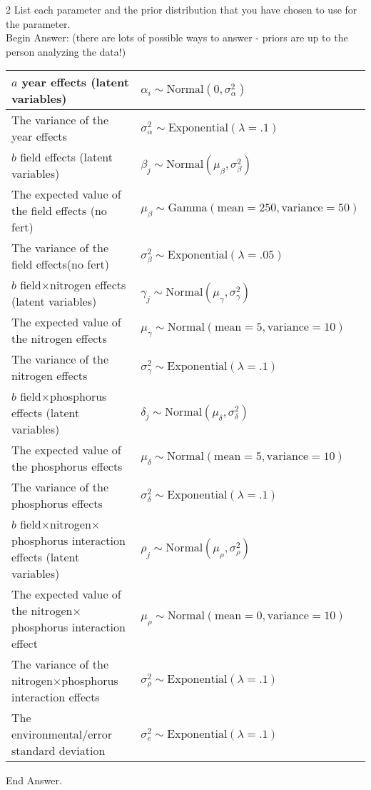 \documentclass[11pt]{article}
\newcommand{\answer}[1]{{\color{red}\sc Begin Answer: }#1{\color{red}\sc End Answer.\\}}
\begin{document}
\begin{doublespace}	
\begin{compactenum}
	\item[2] List each parameter and the prior distribution that you have chosen to use for the parameter.
	\\\answer{ (there are lots of possible ways to answer - priors are up to the person analyzing the data!)
\begin{center}
\begin{tabular}{|p{9cm}l|}
\hline
$a$ year effects (latent variables)&  $\alpha_i\sim \mbox{Normal}(0, \sigma_{\alpha}^2)$\\
\hline
The variance of the year effects &  $\sigma_{\alpha}^2 \sim \mbox{Exponential}(\lambda=.1)$ \\
\hline
$b$ field effects (latent variables)&  $\beta_j\sim \mbox{Normal}(\mu_{\beta}, \sigma_{\beta}^2)$\\
\hline
The expected value of the field effects (no fert)&  $\mu_{\beta} \sim \mbox{Gamma}(\mbox{mean}=250, \mbox{variance}=50)$\\
\hline
The variance of the field effects(no fert) &  $\sigma_{\beta}^2 \sim \mbox{Exponential}(\lambda=.05)$\\
\hline
$b$ field$\times$nitrogen effects (latent variables)&  $\gamma_j\sim \mbox{Normal}(\mu_{\gamma}, \sigma_{\gamma}^2)$\\
\hline
The expected value of the nitrogen effects&  $\mu_{\gamma} \sim \mbox{Normal}(\mbox{mean}=5, \mbox{variance}=10)$\\
\hline
The variance of the nitrogen effects&  $\sigma_{\gamma}^2 \sim \mbox{Exponential}(\lambda=.1)$\\
\hline
$b$ field$\times$phosphorus effects (latent variables)&  $\delta_j\sim \mbox{Normal}(\mu_{\delta}, \sigma_{\delta}^2)$\\
\hline
The expected value of the phosphorus effects&  $\mu_{\delta} \sim \mbox{Normal}(\mbox{mean}=5, \mbox{variance}=10)$\\
\hline
The variance of the phosphorus effects&  $\sigma_{\delta}^2 \sim \mbox{Exponential}(\lambda=.1)$\\
\hline
$b$ field$\times$nitrogen$\times$phosphorus interaction effects (latent variables)&  $\rho_j\sim \mbox{Normal}(\mu_{\rho}, \sigma_{\rho}^2)$\\
\hline
The expected value of the nitrogen$\times$phosphorus interaction effect&  $\mu_{\rho} \sim \mbox{Normal}(\mbox{mean}=0, \mbox{variance}=10)$\\
\hline
The variance of the nitrogen$\times$phosphorus interaction effects&  $\sigma_{\rho}^2 \sim \mbox{Exponential}(\lambda=.1)$\\
\hline
The environmental/error standard deviation&  $\sigma_e^2\sim \mbox{Exponential}(\lambda=.1)$\\
\hline
\end{tabular}
\end{center}
\label{default}
	}
\end{compactenum}
\end{doublespace}
\end{document}
